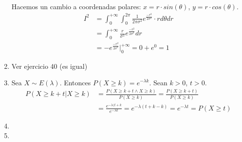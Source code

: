 \begin{enumerate}
		Hacemos un cambio a coordenadas polares: $x = r\cdot sin(\theta)$, $y = r\cdot cos(\theta)$.
		\begin{align*}
			I^2	& = \int_{0}^{+\infty} \int_{0}^{2\pi} \frac{1}{2\pi \sigma^2} e^{\frac{-r^2}{2\sigma^2}}\cdot r d\theta dr	\\
				& = \int_{0}^{+\infty} \frac{r}{\sigma^2} e^{\frac{-r^2}{2\sigma^2}} dr										\\
				& =  -e^{\frac{-r^2}{2\sigma^2}}\Big|_{0}^{+\infty} = 0 + e^0 = 1
		\end{align*}
	\item
		Ver ejercicio 40 (es igual)
	\item
		Sea $X\sim E(\lambda)$. Entonces $P(X \geq k) = e^{-\lambda k}$.
		Sean $k>0$, $t>0$.
		\begin{align*}
			P(X \geq k+t | X\geq k)	& = \frac{P(X \geq k+t \land X\geq k)}{P(X\geq k)} = \frac{P(X \geq k+t)}{P(X\geq k)}	\\
									& = \frac{e^{-\lambda (t+k}}{e^{-\lambda k}} = e^{-\lambda (t+k-k)} = e^{-\lambda t} = P(X \geq t)
		\end{align*}
	\item
		
	\item
		
\end{enumerate}
